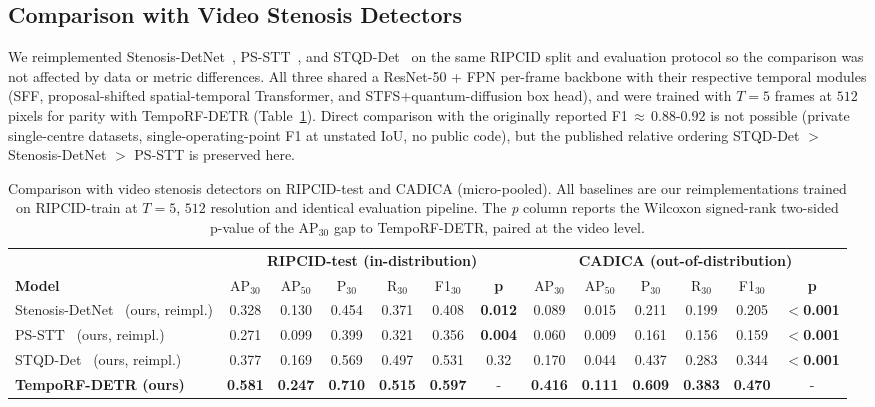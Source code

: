 \documentclass[conference]{IEEEtran}
\begin{document}
\subsection{Comparison with Video Stenosis Detectors}
\label{sec:exp_video}

We reimplemented Stenosis-DetNet~\cite{PANG2021101900}, PS-STT~\cite{HAN2023106546}, and STQD-Det~\cite{STQD-Det} on the same RIPCID split and evaluation protocol so the comparison was not affected by data or metric differences. All three shared a ResNet-50 + FPN per-frame backbone with their respective temporal modules (SFF, proposal-shifted spatial-temporal Transformer, and STFS+quantum-diffusion box head), and were trained with $T=5$ frames at $512$ pixels for parity with TempoRF-DETR (Table~\ref{tab:video_methods}). Direct comparison with the originally reported F1$\,\approx\,0.88$-$0.92$ is not possible (private single-centre datasets, single-operating-point F1 at unstated IoU, no public code), but the published relative ordering STQD-Det $>$ Stenosis-DetNet $>$ PS-STT is preserved here.

\begin{table}[!t]
\centering
\caption{Comparison with video stenosis detectors on RIPCID-test and CADICA (micro-pooled). All baselines are our reimplementations trained on RIPCID-train at $T{=}5$, $512$ resolution and identical evaluation pipeline. The \emph{p} column reports the Wilcoxon signed-rank two-sided p-value of the AP$_{30}$ gap to TempoRF-DETR, paired at the video level.}
\label{tab:video_methods}
\footnotesize
\begin{tabular}{lcccccc|cccccc}
\hline
& \multicolumn{6}{c|}{\textbf{RIPCID-test (in-distribution)}} & \multicolumn{6}{c}{\textbf{CADICA (out-of-distribution)}} \\
\textbf{Model} & AP$_{30}$ & AP$_{50}$ & P$_{30}$ & R$_{30}$ & F1$_{30}$ & \textbf{p} & AP$_{30}$ & AP$_{50}$ & P$_{30}$ & R$_{30}$ & F1$_{30}$ & \textbf{p} \\
\hline
Stenosis-DetNet~\cite{PANG2021101900} (ours, reimpl.)  & 0.328 & 0.130 & 0.454 & 0.371 & 0.408 & \textbf{0.012} & 0.089 & 0.015 & 0.211 & 0.199 & 0.205 & \textbf{$<$0.001} \\
PS-STT~\cite{HAN2023106546} (ours, reimpl.)            & 0.271 & 0.099 & 0.399 & 0.321 & 0.356 & \textbf{0.004} & 0.060 & 0.009 & 0.161 & 0.156 & 0.159 & \textbf{$<$0.001} \\
STQD-Det~\cite{STQD-Det} (ours, reimpl.)               & 0.377 & 0.169 & 0.569 & 0.497 & 0.531 & 0.32 \phantom{x} & 0.170 & 0.044 & 0.437 & 0.283 & 0.344 & \textbf{$<$0.001} \\
\textbf{TempoRF-DETR (ours)}                           & \textbf{0.581} & \textbf{0.247} & \textbf{0.710} & \textbf{0.515} & \textbf{0.597} &  -  & \textbf{0.416} & \textbf{0.111} & \textbf{0.609} & \textbf{0.383} & \textbf{0.470} &  -  \\
\hline
\end{tabular}
\end{table}
\end{document}
